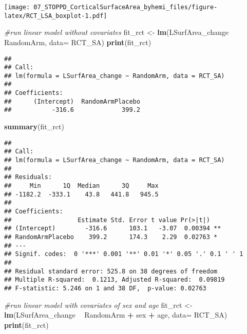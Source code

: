 \documentclass[]{article}
\newenvironment{Shaded}{\begin{snugshade}}{\end{snugshade}}
\newcommand{\KeywordTok}[1]{\textcolor[rgb]{0.13,0.29,0.53}{\textbf{#1}}}
\newcommand{\DataTypeTok}[1]{\textcolor[rgb]{0.13,0.29,0.53}{#1}}
\newcommand{\StringTok}[1]{\textcolor[rgb]{0.31,0.60,0.02}{#1}}
\newcommand{\CommentTok}[1]{\textcolor[rgb]{0.56,0.35,0.01}{\textit{#1}}}
\newcommand{\OperatorTok}[1]{\textcolor[rgb]{0.81,0.36,0.00}{\textbf{#1}}}
\newcommand{\NormalTok}[1]{#1}
\theoremstyle{definition}
\theoremstyle{definition}
\theoremstyle{definition}
\theoremstyle{remark}
\begin{document}
\texttt{[image: 07\_STOPPD\_CorticalSurfaceArea\_byhemi\_files/figure-latex/RCT\_LSA\_boxplot-1.pdf]}

\begin{Shaded}
\begin{Highlighting}[]
\CommentTok{#run linear model without covariates}
\NormalTok{  fit_rct <-}\StringTok{ }\KeywordTok{lm}\NormalTok{(LSurfArea_change }\OperatorTok{~}\StringTok{ }\NormalTok{RandomArm, }\DataTypeTok{data=}\NormalTok{ RCT_SA)}
  \KeywordTok{print}\NormalTok{(fit_rct)}
\end{Highlighting}
\end{Shaded}

\begin{verbatim}
## 
## Call:
## lm(formula = LSurfArea_change ~ RandomArm, data = RCT_SA)
## 
## Coefficients:
##      (Intercept)  RandomArmPlacebo  
##           -316.6             399.2
\end{verbatim}

\begin{Shaded}
\begin{Highlighting}[]
  \KeywordTok{summary}\NormalTok{(fit_rct)}
\end{Highlighting}
\end{Shaded}

\begin{verbatim}
## 
## Call:
## lm(formula = LSurfArea_change ~ RandomArm, data = RCT_SA)
## 
## Residuals:
##     Min      1Q  Median      3Q     Max 
## -1182.2  -333.1    43.8   441.8   945.5 
## 
## Coefficients:
##                  Estimate Std. Error t value Pr(>|t|)   
## (Intercept)        -316.6      103.1   -3.07  0.00394 **
## RandomArmPlacebo    399.2      174.3    2.29  0.02763 * 
## ---
## Signif. codes:  0 '***' 0.001 '**' 0.01 '*' 0.05 '.' 0.1 ' ' 1
## 
## Residual standard error: 525.8 on 38 degrees of freedom
## Multiple R-squared:  0.1213, Adjusted R-squared:  0.09819 
## F-statistic: 5.246 on 1 and 38 DF,  p-value: 0.02763
\end{verbatim}

\begin{Shaded}
\begin{Highlighting}[]
\CommentTok{#run linear model with covariates of sex and age}
\NormalTok{  fit_rct <-}\StringTok{ }\KeywordTok{lm}\NormalTok{(LSurfArea_change }\OperatorTok{~}\StringTok{ }\NormalTok{RandomArm }\OperatorTok{+}\StringTok{ }\NormalTok{sex }\OperatorTok{+}\StringTok{ }\NormalTok{age, }\DataTypeTok{data=}\NormalTok{ RCT_SA)}
  \KeywordTok{print}\NormalTok{(fit_rct)}
\end{Highlighting}
\end{Shaded}
\end{document}
